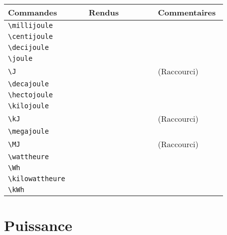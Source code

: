 \documentclass[a4paper,12pt]{article}
\newcommand{\rac}{({\color{red}Raccourci})}
\begin{document}
	
	\noindent
	\begin{tabular}{|p{0.35\linewidth}|p{0.3\linewidth}|p{0.3\linewidth}|}
		\hline
 			\textbf{Commandes}&\textbf{Rendus}&\textbf{Commentaires}
 		\\\hline\hline
			\verb!\millijoule!	& 	\millijoule	&	\\
		\hline
			\verb!\centijoule!	& 	\centijoule	&	\\
		\hline
			\verb!\decijoule!	& 	\decijoule	&	\\
		\hline
			\verb!\joule!		& 	\joule		&	\\
		\hline
			\verb!\J!		& 	\J		&	\rac\\
		\hline
			\verb!\decajoule!	& 	\decajoule	&	\\
		\hline
			\verb!\hectojoule!	& 	\hectojoule	&	\\
		\hline
			\verb!\kilojoule!	& 	\kilojoule	&	\\
		\hline
			\verb!\kJ!		& 	\kJ		&	\rac\\
		\hline
			\verb!\megajoule!	& 	\megajoule	&	\\
		\hline
			\verb!\MJ!		& 	\MJ		&	\rac\\
		\hline
			\verb!\wattheure!		& 	\wattheure		&	\\
		\hline
			\verb!\Wh!		& 	\Wh		&	\\
		\hline
			\verb!\kilowattheure!		& 	\kilowattheure		&	\\
		\hline
			\verb!\kWh!		& 	\kWh		&	\\
		\hline
	\end{tabular}
	
	

	\section{Puissance}
	
\end{document}
